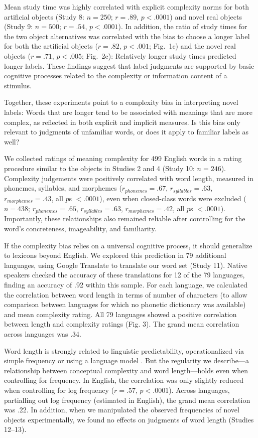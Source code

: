 \documentclass[12pt]{article}
\begin{document}
Mean study time was highly correlated with explicit complexity norms for both artificial objects (Study 8: $n = 250$; $r = .89$, $p < .0001$) and novel real objects (Study 9: $n = 500$; $r = .54$, $p < .0001$). In addition, the ratio of study times for the two object alternatives was correlated with the bias to choose a longer label for both the artificial objects ($r = .82$, $p < .001$; Fig.\ 1c) and the novel real objects ($r = .71$, $p < .005$; Fig.\ 2c): Relatively longer study times predicted longer labels. These findings suggest that label judgments are supported by basic cognitive processes related to the complexity or information content of a stimulus. 
					
Together, these experiments point to a complexity bias in interpreting novel labels: Words that are longer tend to be associated with meanings that are more complex, as reflected in both explicit and implicit measures. Is this bias only relevant to judgments of unfamiliar words, or does it apply to familiar labels as well? 



We collected ratings of meaning complexity for 499 English words in a rating procedure similar to the objects in Studies 2 and 4 (Study 10: $n = 246$). Complexity judgements were positively correlated with word length, measured in phonemes, syllables, and morphemes ($r_{phonemes} = .67$, $r_{syllables} = .63$, $r_{morphemes} = .43$, all $p$s $< .0001$), even when closed-class words were excluded ($n = 438$; $r_{phonemes} = .65$, $r_{syllables} = .63$, $r_{morphemes} = .42$, all $p$s $< .0001$). Importantly, these relationships also remained reliable after controlling for the word's concreteness, imageability, and familiarity. 
						
If the complexity bias relies on a universal cognitive process, it should generalize to lexicons beyond English. We explored this prediction in 79 additional languages, using Google Translate to translate our word set (Study 11). Native speakers checked the accuracy of these translations for 12 of the 79 languages, finding an accuracy of .92 within this sample. For each language, we calculated the correlation between word length in terms of number of characters (to allow comparison between languages for which no phonetic dictionary was available) and mean complexity rating. All 79 languages showed a positive correlation between length and complexity ratings (Fig. 3). The grand mean correlation across languages was .34. 
					

Word length is strongly related to linguistic predictability, operationalized via simple frequency \cite{zipf1936} or using a language model \cite{piantadosi2011a}. But the regularity we describe---a relationship between conceptual complexity and word length---holds even when controlling for frequency. In English, the correlation was only slightly reduced when controlling for log frequency ($r = .57$, $p < .0001$). Across languages, partialling out log frequency (estimated in English), the grand mean correlation was .22. In addition, when we manipulated the observed frequencies of novel objects experimentally, we found no effects on judgments of word length (Studies 12--13). 
\end{document}
